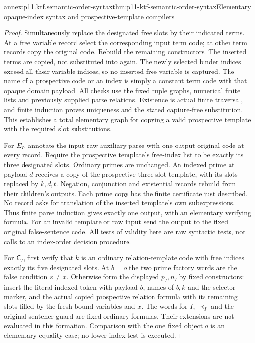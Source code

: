 \begin{annexitem}{annex:p11.ktf.semantic-order-syntax}{thm:p11-ktf-semantic-order-syntax}{Elementary opaque-index syntax and prospective-template compilers}
\begin{proof}
Simultaneously replace the designated free slots by their indicated
terms. At a free variable record select the corresponding input
term code; at other term records copy the original code. Rebuild
the remaining constructors. The inserted terms are copied, not
substituted into again. The newly selected binder indices exceed
all their variable indices, so no inserted free variable is captured.
The name of a prospective code or an index is simply a constant
term code with that opaque domain payload. All checks use the
fixed tuple graphs, numerical finite lists and previously supplied
parse relations. Existence is actual finite traversal, and finite
induction proves uniqueness and the stated capture-free substitution.
This establishes a total elementary graph for copying a valid
prospective template with the required slot substitutions.

For \(E_I\), annotate the input raw auxiliary parse with one
output original code at every record. Require the prospective template's
free-index list to be exactly its three designated slots. Ordinary
primes are unchanged.
An indexed prime at payload \(d\) receives a copy of the
prospective three-slot template, with its slots replaced by
\(\dot k,\dot d,t\). Negation, conjunction and existential
records rebuild from their children's outputs. Each prime copy has
the finite certificate just described. No record asks for translation
of the inserted template's own subexpressions. Thus finite parse
induction gives exactly one output, with an elementary verifying
formula. For an invalid template or raw input send the output to
the fixed original false-sentence code. All tests of validity here
are raw syntactic tests, not calls to an index-order decision procedure.

For \(\mathsf C_I\), first verify that \(k\) is an
ordinary relation-template code with free indices exactly its five
designated slots. At \(b=o\) the two prime factory words are
the false condition \(x\ne x\). Otherwise form the displayed
\(p_I,n_I\) by fixed constructors: insert the literal indexed
token with payload \(b\), names of \(b,k\) and the selector
marker, and the actual copied prospective relation formula with
its remaining slots filled by the fresh bound variables and \(x\).
The words for \(I\), \(\prec_I\) and the original sentence
guard are fixed ordinary formulas. Their extensions are not evaluated
in this formation. Comparison with the one fixed object \(o\)
is an elementary equality case; no lower-index test is executed.


\end{proof}
\end{annexitem}
